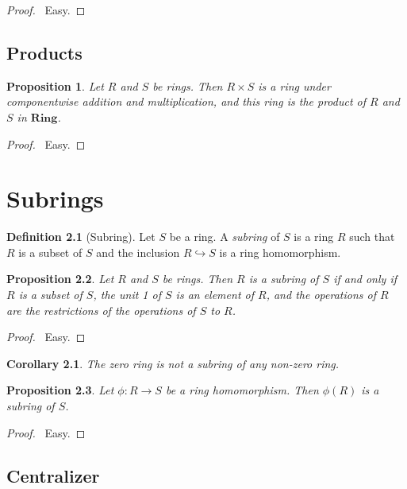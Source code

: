 \documentclass{book}
\let\qed\relax
\newtheorem{prop}{Proposition}[chapter]
\newtheorem{cor}{Corollary}[prop]
\theoremstyle{definition}
\newtheorem{df}[prop]{Definition}
\newcommand{\Ring}{\ensuremath{\mathbf{Ring}}}
\begin{document}
\begin{proof}
\pf\ Easy. \qed
\end{proof}
 
\section{Products}

\begin{prop}
Let $R$ and $S$ be rings. Then $R \times S$ is a ring under componentwise addition and multiplication, and this ring is the product of $R$ and $S$ in $\Ring$.
\end{prop}

\begin{proof}
\pf\ Easy. \qed
\end{proof}


\chapter{Subrings}

\begin{df}[Subring]
Let $S$ be a ring. A \emph{subring} of $S$ is a ring $R$ such that $R$ is a subset of $S$ and the inclusion $R \hookrightarrow S$ is a ring homomorphism.
\end{df}

\begin{prop}
Let $R$ and $S$ be rings. Then $R$ is a subring of $S$ if and only if $R$ is a subset of $S$, the unit 1 of $S$ is an element of $R$, and the operations of $R$ are the restrictions of the operations of $S$ to $R$.
\end{prop}

\begin{proof}
\pf\ Easy. \qed
\end{proof}

\begin{cor}
The zero ring is not a subring of any non-zero ring.
\end{cor}

\begin{prop}
Let $\phi : R \rightarrow S$ be a ring homomorphism. Then $\phi(R)$ is a subring of $S$.
\end{prop}

\begin{proof}
\pf\ Easy. \qed
\end{proof}

\section{Centralizer}
\end{document}
